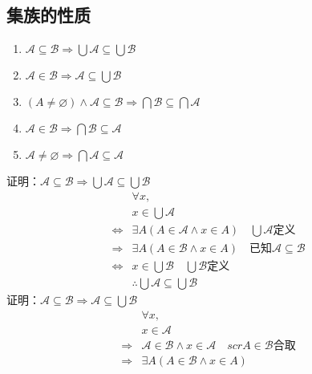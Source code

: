 \documentclass{book}
\newcommand{\Eqv}{\Leftrightarrow}
\newcommand{\To}{\Rightarrow}
\newcommand{\A}{\forall}
\newcommand{\E}{\exists}
\newcommand{\no}{\varnothing}
\newcommand{\scr}[1]{\mathscr{#1}}
\begin{document}
\subsection{集族的性质}
\begin{enumerate}
    \item $\scr{A}\subseteq\scr{B}\To\bigcup\scr{A}\subseteq\bigcup\scr{B}$
    \item $\scr{A}\in\scr{B}\To\scr{A}\subseteq\bigcup\scr{B}$
    \item $(A\neq\no)\land\scr{A}\subseteq\scr{B}\To\bigcap\scr{B}\subseteq\bigcap\scr{A}$
    \item $\scr{A}\in\scr{B}\To\bigcap\scr{B}\subseteq\scr{A}$
    \item $\scr{A}\neq\no\To\bigcap\scr{A}\subseteq\scr{A}$
\end{enumerate}
证明：$\scr{A}\subseteq\scr{B}\To\bigcup\scr{A}\subseteq\bigcup\scr{B}$
\begin{align*}
    &\A x,\\
    &x\in\bigcup\scr{A}\\
    \Eqv&\E A(A\in\scr{A}\land x\in A)\quad\bigcup\scr{A}\mbox{定义}\\
    \To&\E A(A\in \scr{B}\land x\in A)\quad\mbox{已知}\scr{A}\subseteq\scr{B}\\
    \Eqv&x\in\bigcup\scr{B}\quad\bigcup\scr{B}\mbox{定义}\\
    &\therefore \bigcup\scr{A}\subseteq\bigcup\scr{B}
\end{align*}
证明：$\scr{A}\subseteq\scr{B}\To\scr{A}\subseteq\bigcup\scr{B}$
\begin{align*}
    &\A x,\\
    &x\in\scr{A}\\
    \To&\scr{A}\in\scr{B}\land x\in\scr{A}\quad\mbox{$scr{A}\in\scr{B}$合取}\\
    \To&\E A(A\in\scr{B}\land x\in A)
\end{align*}
\end{document}

